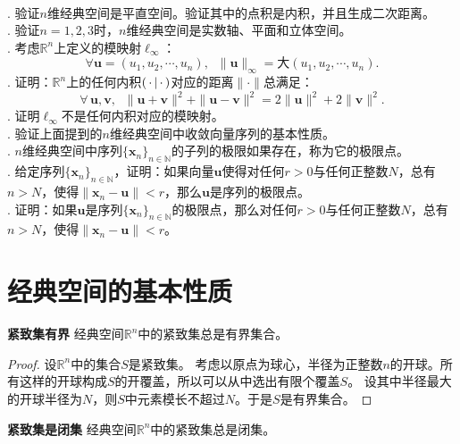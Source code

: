 \documentclass[12pt,UTF8,fontset=none]{ctexbook}
\begin{document}
\begin{appendix}
\begin{xt}
    \mbox{}\\
    . 验证$n$维经典空间是平直空间。验证其中的点积是内积，并且生成二次距离。\\
    . 验证$n=1,2,3$时，$n$维经典空间是实数轴、平面和立体空间。\\
    . 考虑$\mathbb{R}^n$上定义的模映射$\ell_{\infty}$：
    $$ \forall \mathbf{u} = (u_1, u_2, \cdots, u_n), \;\; \| \mathbf{u} \|_{\infty} = \text{大}(u_1, u_2, \cdots, u_n).$$
    . 证明：$\mathbb{R}^n$上的任何内积$\displaystyle\left( \,\cdot \,\middle\vert \,\cdot \,\right)$对应的距离$\|\cdot \|$总满足：
    $$\forall \, \mathbf{u}, \mathbf{v},\;\; \|\mathbf{u} + \mathbf{v}\|^2 + \|\mathbf{u} - \mathbf{v}\|^2 = 2\|\mathbf{u}\|^2 + 2\|\mathbf{v}\|^2. $$
    . 证明$\ell_{\infty}$不是任何内积对应的模映射。\\
    . 验证上面提到的$n$维经典空间中收敛向量序列的基本性质。\\
    . $n$维经典空间中序列$\{\mathbf{x}_n\}_{n\in\mathbb{N}}$的子列的极限如果存在，称为它的极限点。\\
    . 给定序列$\{\mathbf{x}_n\}_{n\in\mathbb{N}}$，证明：如果向量$\mathbf{u}$使得对任何$r>0$与任何正整数$N$，总有$n>N$，使得$\|\mathbf{x}_n - \mathbf{u}\| < r$，那么$\mathbf{u}$是序列的极限点。\\
    . 证明：如果$\mathbf{u}$是序列$\{\mathbf{x}_n\}_{n\in\mathbb{N}}$的极限点，那么对任何$r>0$与任何正整数$N$，总有$n>N$，使得$\|\mathbf{x}_n - \mathbf{u}\| < r$。\\

\end{xt}

\section{经典空间的基本性质}

\begin{tm}{\textbf{紧致集有界}}\label{tm:b-2-0}
    经典空间$\mathbb{R}^n$中的紧致集总是有界集合。
\end{tm}

\begin{proof}
    设$\mathbb{R}^n$中的集合$S$是紧致集。
    考虑以原点为球心，半径为正整数$n$的开球。所有这样的开球构成$S$的开覆盖，所以可以从中选出有限个覆盖$S$。
    设其中半径最大的开球半径为$N$，则$S$中元素模长不超过$N$。于是$S$是有界集合。
\end{proof}

\begin{tm}{\textbf{紧致集是闭集}}\label{tm:b-2-10}
    经典空间$\mathbb{R}^n$中的紧致集总是闭集。
\end{tm}


\end{appendix}
\end{document}
